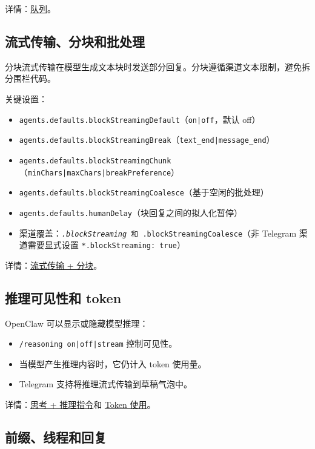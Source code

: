 详情：\href{/concepts/queue}{队列}。

\subsection{流式传输、分块和批处理}


分块流式传输在模型生成文本块时发送部分回复。分块遵循渠道文本限制，避免拆分围栏代码。

关键设置：

\begin{itemize}
  \item \texttt{agents.defaults.blockStreamingDefault}（\texttt{on|off}，默认 off）
  \item \texttt{agents.defaults.blockStreamingBreak}（\texttt{text\_end|message\_end}）
  \item \texttt{agents.defaults.blockStreamingChunk}（\texttt{minChars|maxChars|breakPreference}）
  \item \texttt{agents.defaults.blockStreamingCoalesce}（基于空闲的批处理）
  \item \texttt{agents.defaults.humanDelay}（块回复之间的拟人化暂停）
  \item 渠道覆盖：\texttt{\textit{.blockStreaming} 和 \texttt{}.blockStreamingCoalesce}（非 Telegram 渠道需要显式设置 \texttt{*.blockStreaming: true}）
\end{itemize}


详情：\href{/concepts/streaming}{流式传输 + 分块}。

\subsection{推理可见性和 token}


OpenClaw 可以显示或隐藏模型推理：

\begin{itemize}
  \item \texttt{/reasoning on|off|stream} 控制可见性。
  \item 当模型产生推理内容时，它仍计入 token 使用量。
  \item Telegram 支持将推理流式传输到草稿气泡中。
\end{itemize}


详情：\href{/tools/thinking}{思考 + 推理指令}和 \href{/reference/token-use}{Token 使用}。

\subsection{前缀、线程和回复}


